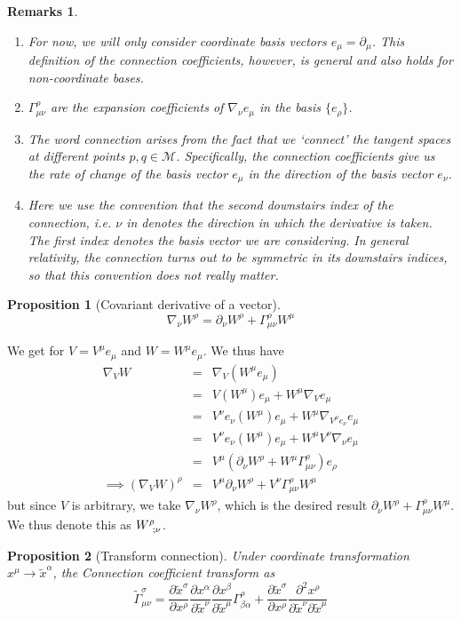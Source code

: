 \documentclass[a4paper]{article}
\newtheorem{remarks}{Remarks}[section]
\theoremstyle{new}
\newtheorem{prop}{Proposition}[section]
\begin{document}
\begin{remarks}\leavevmode
\begin{enumerate}
    \item For now, we will only consider coordinate basis vectors $e_\mu = \partial_\mu$. This definition of the connection coefficients, however, is general and also holds for non-coordinate bases.
    \item $\Gamma_{\mu\nu}^\rho$ are the expansion coefficients of $\nabla_\nu e_\mu$ in the basis $\{e_\rho\}$.
    \item The word connection arises from the fact that we `connect' the tangent spaces at different points $p,q\in\mathcal{M}$. Specifically, the connection coefficients give us the rate of change of the basis vector $e_\mu$ in the direction of the basis vector $e_\nu$.
    \item Here we use the convention that the second downstairs index of the connection, i.e. $\nu$ in denotes the direction in which the derivative is taken. The first index denotes the basis vector we are considering. In general relativity, the connection turns out to be symmetric in its downstairs indices, so that this convention does not really matter.
\end{enumerate}
\end{remarks}
\begin{prop}[Covariant derivative of a vector]
$$\nabla_\nu W^\rho=\partial_\nu W^\rho+\Gamma_{\mu\nu}^\rho W^\mu$$
\end{prop}
We get for $V=V^\mu e_\mu$ and $W=W^\mu e_\mu$. We thus have
\begin{eqnarray}
\nabla_VW&=&\nabla_V(W^\mu e_\mu)\nonumber\\&=&V(W^\mu)e_\mu+W^\mu\nabla_Ve_\mu\nonumber\\&=&V^\nu e_\nu(W^\mu)e_\mu+W^\mu\nabla_{V^\mu e_\nu}e_\mu\nonumber\\&=&V^\nu e_\nu(W^\mu)e_\mu+W^\mu V^\nu\nabla_{\nu}e_\mu\nonumber\\&=&V^\mu(\partial_\nu W^\rho+W^\mu\Gamma_{\mu\nu}^\rho)e_\rho\nonumber\\\implies(\nabla_VW)^\rho&=&V^\mu\partial_\nu W^\rho+V^\nu\Gamma_{\mu\nu}^\rho W^\mu\nonumber
\end{eqnarray}
but since $V$ is arbitrary, we take $\nabla_\nu W^\rho$, which is the desired result $\partial_\nu W^\rho+\Gamma_{\mu\nu}^\rho W^\mu$. We thus denote this as $\tensor*{W}{*_{}^{\rho}_{;\nu}}$. 
\begin{prop}[Transform connection]
Under coordinate transformation $x^\mu\rightarrow\tilde{x}^\alpha$, the Connection coefficient transform as
$$\tilde{\Gamma}^\sigma_{\mu\nu}=\frac{\partial\tilde{x}^\sigma}{\partial x^\rho}\frac{\partial x^\alpha}{\partial\tilde{x}^\nu}\frac{\partial x^\beta}{\partial\tilde{x}^\mu}\Gamma_{\beta\alpha}^\rho+\frac{\partial\tilde{x}^\sigma}{\partial x^\rho}\frac{\partial^2x^\rho}{\partial\tilde{x}^\nu\partial\tilde{x}^\mu}$$
\end{prop}
\end{document}
